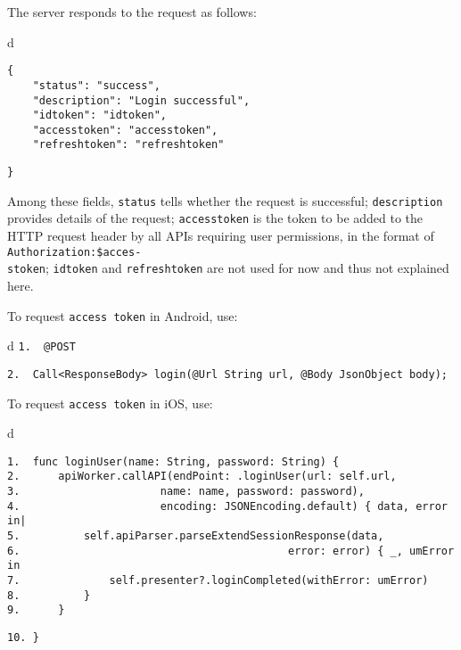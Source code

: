 \documentclass[a4paper,12pt]{book}
\begin{document}
The server responds to the request as follows:

\begin{codebloc}
\begin{tabular}{d}
\vspace{2pt}
\begin{verbatim}
{
    "status": "success",
    "description": "Login successful",
    "idtoken": "idtoken",
    "accesstoken": "accesstoken",
    "refreshtoken": "refreshtoken"
\end{verbatim}
\verb|}|
\end{tabular}
\end{codebloc}

Among these fields, \verb|status| tells whether the request is successful; \verb|description| provides details of the request; \verb|accesstoken| is the token to be added to the HTTP request header by all APIs requiring user permissions, in the format of \verb|Authorization:$acces-|\\
\verb|stoken|; \verb|idtoken| and \verb|refreshtoken| are not used for now and thus not explained here.

To request \verb|access token| in Android, use:

\begin{codebloc}
\begin{tabular}{d}
\verb|1.  @POST|

\verb|2.  Call<ResponseBody> login(@Url String url, @Body JsonObject body);|
\end{tabular}
\end{codebloc}


To request \verb|access token| in iOS, use:

\begin{codebloc}
\begin{tabular}{d}
\vspace{2pt}
\begin{verbatim}
1.  func loginUser(name: String, password: String) {
2.      apiWorker.callAPI(endPoint: .loginUser(url: self.url,
3.                      name: name, password: password),
4.                      encoding: JSONEncoding.default) { data, error in|
5.          self.apiParser.parseExtendSessionResponse(data,
6.                                          error: error) { _, umError in
7.              self.presenter?.loginCompleted(withError: umError)
8.          }
9.      }
\end{verbatim}
\verb|10. }|
\end{tabular}
\end{codebloc}
\end{document}
